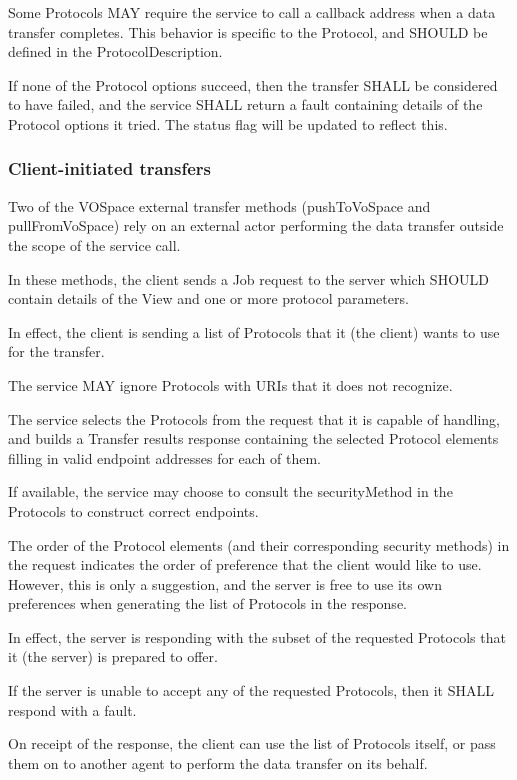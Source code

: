 \documentclass[11pt,a4paper]{ivoa}
\begin{document}
Some Protocols MAY require the service to call a callback address when a data transfer completes. This behavior is specific to the Protocol, and SHOULD be defined in the ProtocolDescription.

If none of the Protocol options succeed, then the transfer SHALL be considered to have failed, and the service SHALL return a fault containing details of the Protocol options it tried. The status flag will be updated to reflect this.

\subsubsection{Client-initiated transfers}
\label{subsubsec:client-initiated transfers}
Two of the VOSpace external transfer methods (pushToVoSpace and pullFromVoSpace) rely on an external actor performing the data transfer outside the scope of the service call.

In these methods, the client sends a Job request to the server which SHOULD contain details of the View and one or more protocol parameters.

In effect, the client is sending a list of Protocols that it (the client) wants to use for the transfer.

The service MAY ignore Protocols with URIs that it does not recognize.

The service selects the Protocols from the request that it is capable of handling, and builds a Transfer results response containing the selected Protocol elements filling in valid endpoint addresses for each of them.

If available, the service may choose to consult the securityMethod in the Protocols to construct correct endpoints.

The order of the Protocol elements (and their corresponding security methods) in the request indicates the order of preference that the client would like to use. However, this is only a suggestion, and the server is free to use its own preferences when generating the list of Protocols in the response.

In effect, the server is responding with the subset of the requested Protocols that it (the server) is prepared to offer.

If the server is unable to accept any of the requested Protocols, then it SHALL respond with a fault.

On receipt of the response, the client can use the list of Protocols itself, or pass them on to another agent to perform the data transfer on its behalf.
\end{document}
